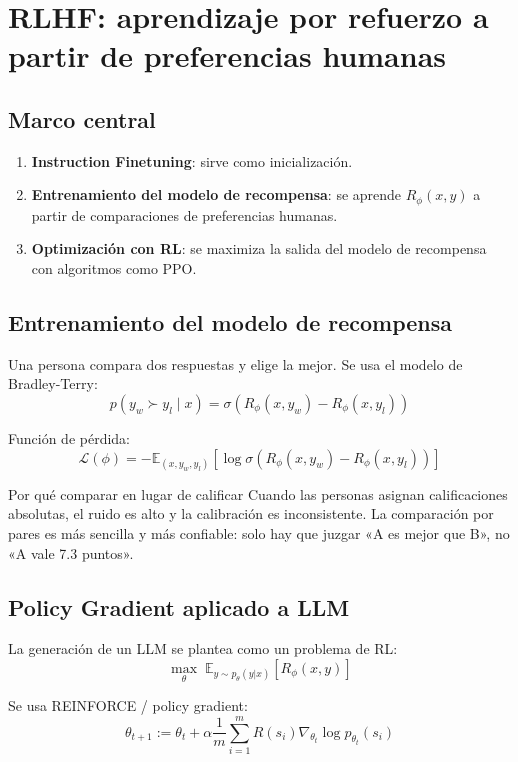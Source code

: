\section{RLHF: aprendizaje por refuerzo a partir de preferencias humanas}

\subsection{Marco central}

\begin{enumerate}
    \item \textbf{Instruction Finetuning}: sirve como inicialización.
    \item \textbf{Entrenamiento del modelo de recompensa}: se aprende $R_\phi(x, y)$ a partir de comparaciones de preferencias humanas.
    \item \textbf{Optimización con RL}: se maximiza la salida del modelo de recompensa con algoritmos como PPO.
\end{enumerate}

\subsection{Entrenamiento del modelo de recompensa}

Una persona compara dos respuestas y elige la mejor. Se usa el modelo de Bradley-Terry:
$$p(y_w \succ y_l \mid x) = \sigma(R_\phi(x, y_w) - R_\phi(x, y_l))$$

Función de pérdida:
$$\mathcal{L}(\phi) = -\mathbb{E}_{(x, y_w, y_l)}\left[\log \sigma(R_\phi(x, y_w) - R_\phi(x, y_l))\right]$$

\begin{knowledgebox}{Por qué comparar en lugar de calificar}
Cuando las personas asignan calificaciones absolutas, el ruido es alto y la calibración es inconsistente. La comparación por pares es más sencilla y más confiable: solo hay que juzgar «A es mejor que B», no «A vale 7.3 puntos».
\end{knowledgebox}

\subsection{Policy Gradient aplicado a LLM}

La generación de un LLM se plantea como un problema de RL:
$$\max_\theta \; \mathbb{E}_{y \sim p_\theta(y|x)} \left[R_\phi(x, y)\right]$$

Se usa REINFORCE / policy gradient:
$$\theta_{t+1} := \theta_t + \alpha \frac{1}{m}\sum_{i=1}^{m} R(s_i) \nabla_{\theta_t} \log p_{\theta_t}(s_i)$$


